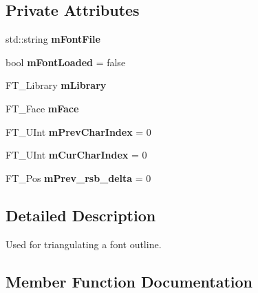 \subsection*{Private Attributes}
\begin{DoxyCompactItemize}
\item 
\mbox{\label{classpepr3d_1_1_font_rasterizer_a2143778af8792270dc56c21d516f0a39}} 
std\+::string {\bfseries m\+Font\+File}
\item 
\mbox{\label{classpepr3d_1_1_font_rasterizer_a86bb6289a6c838b3988fb38b86fab014}} 
bool {\bfseries m\+Font\+Loaded} = false
\item 
\mbox{\label{classpepr3d_1_1_font_rasterizer_a61aa06d9f214a6298fc13be6f6821f6b}} 
F\+T\+\_\+\+Library {\bfseries m\+Library}
\item 
\mbox{\label{classpepr3d_1_1_font_rasterizer_a06267b2d5810dc38419f24792d922e79}} 
F\+T\+\_\+\+Face {\bfseries m\+Face}
\item 
\mbox{\label{classpepr3d_1_1_font_rasterizer_a157983c8ac203ec44d551db0f5d33075}} 
F\+T\+\_\+\+U\+Int {\bfseries m\+Prev\+Char\+Index} = 0
\item 
\mbox{\label{classpepr3d_1_1_font_rasterizer_a614fd5782aec36c0f5afd3c4f45b51ac}} 
F\+T\+\_\+\+U\+Int {\bfseries m\+Cur\+Char\+Index} = 0
\item 
\mbox{\label{classpepr3d_1_1_font_rasterizer_a1fc365e2226ad0555e7fc8e4fa25472d}} 
F\+T\+\_\+\+Pos {\bfseries m\+Prev\+\_\+rsb\+\_\+delta} = 0
\end{DoxyCompactItemize}


\subsection{Detailed Description}
Used for triangulating a font outline. 

\subsection{Member Function Documentation}
\mbox{\label{classpepr3d_1_1_font_rasterizer_a478acb4e2249fe8f6d548e7c850196af}} 
